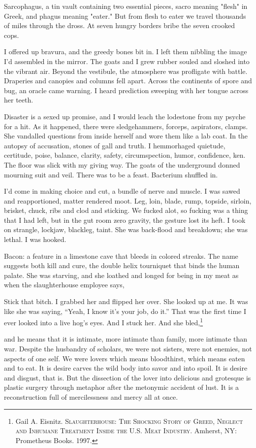 \documentclass[
]{memoir}
\begin{document}
Sarcophagus, a tin vault containing two essential pieces, sacro meaning
"flesh" in Greek, and phagus meaning "eater." But from flesh to eater we
travel thousands of miles through the dross. At seven hungry borders
bribe the seven crooked cops.

I offered up bravura, and the greedy bones bit in. I left them nibbling
the image I'd assembled in the mirror. The goats and I grew rubber
souled and sloshed into the vibrant air. Beyond the vestibule, the
atmosphere was profligate with battle. Draperies and canopies and
columns fell apart. Across the continents of spore and bug, an oracle
came warning. I heard prediction sweeping with her tongue across her
teeth.

Disaster is a sexed up promise, and I would leach the lodestone from my
psyche for a hit. As it happened, there were sledgehammers, forceps,
aspirators, clamps. She vandalled questions from inside herself and wore
them like a lab coat. In the autopsy of accusation, stones of gall and
truth. I hemmorhaged quietude, certitude, poise, balance, clarity,
safety, circumspection, humor, confidence, ken. The floor was slick with
my giving way. The goats of the underground donned mourning suit and
veil. There was to be a feast. Bacterium shuffled in.

I'd come in making choice and cut, a bundle of nerve and muscle. I was
sawed and reapportioned, matter rendered moot. Leg, loin, blade, rump,
topside, sirloin, brisket, chuck, ribs and clod and sticking. We fucked
alot, so fucking was a thing that I had left, but in the gut room zero
gravity, the gesture lost its heft. I took on strangle, lockjaw,
blackleg, taint. She was back-flood and breakdown; she was lethal. I was
hooked.

Bacon: a feature in a limestone cave that bleeds in colored streaks. The
name suggests both kill and cure, the double helix tourniquet that binds
the human palate. She was starving, and she loathed and longed for being
in my meat as when the slaughterhouse employee says,

Stick that bitch. I grabbed her and flipped her over. She looked up at
me. It was like she was saying, ``Yeah, I know it's your job, do it.''
That was the first time I ever looked into a live hog's eyes. And I
stuck her. And she bled,\footnote{Gail A. Eisnitz.
  \textsc{Slaughterhouse: The Shocking Story of Greed, Neglect and
  Inhumane Treatment Inside the U.S. Meat Industry}. Amherst, NY:
  Prometheus Books. 1997.}

and he means that it is intimate, more intimate than family, more
intimate than war. Despite the husbandry of scholars, we were not
sisters, were not enemies, not aspects of one self. We were lovers which
means bloodthirst, which means eaten and to eat. It is desire carves the
wild body into savor and into spoil. It is desire and disgust, that is.
But the dissection of the lover into delicious and grotesque is plastic
surgery through metaphor after the metonymic accident of lust. It is a
reconstruction full of mercilessness and mercy all at once.
\end{document}
